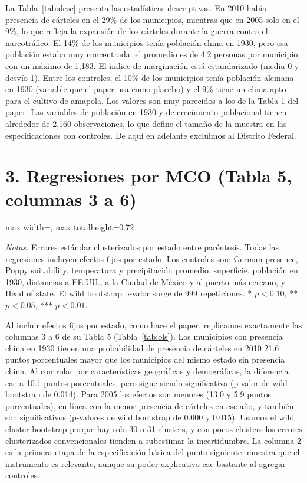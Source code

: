 \documentclass[11pt,a4paper]{article}
\newcommand{\tabla}[1]{\begin{adjustbox}{max width=\linewidth, max totalheight=0.72\textheight}\end{adjustbox}}
\newcommand{\notas}[1]{\par\vspace{0.3em}\begin{minipage}{0.92\linewidth}\footnotesize\textit{Notas:} #1\end{minipage}}
\begin{document}
La Tabla~\ref{tab:desc} presenta las estadísticas descriptivas. En 2010 había presencia de cárteles en el 29\% de los municipios, mientras que en 2005 solo en el 9\%, lo que refleja la expansión de los cárteles durante la guerra contra el narcotráfico. El 14\% de los municipios tenía población china en 1930, pero esa población estaba muy concentrada: el promedio es de 4.2 personas por municipio, con un máximo de 1,183. El índice de marginación está estandarizado (media 0 y desvío 1). Entre los controles, el 10\% de los municipios tenía población alemana en 1930 (variable que el paper usa como placebo) y el 9\% tiene un clima apto para el cultivo de amapola. Los valores son muy parecidos a los de la Tabla 1 del paper. Las variables de población en 1930 y de crecimiento poblacional tienen alrededor de 2,160 observaciones, lo que define el tamaño de la muestra en las especificaciones con controles. De aquí en adelante excluimos al Distrito Federal.

\section*{3. Regresiones por MCO (Tabla 5, columnas 3 a 6)}

\begin{table}[H]\centering
\caption{Presencia china y presencia de cárteles (MCO)}\label{tab:ols}
\small
\tabla{"../output/Tabla 2.tex"}
\notas{Errores estándar clusterizados por estado entre paréntesis. Todas las regresiones incluyen efectos fijos por estado. Los controles son: German presence, Poppy suitability, temperatura y precipitación promedio, superficie, población en 1930, distancias a EE.UU., a la Ciudad de México y al puerto más cercano, y Head of state. El wild bootstrap p-valor surge de 999 repeticiones. * $p<0.10$, ** $p<0.05$, *** $p<0.01$.}
\end{table}

Al incluir efectos fijos por estado, como hace el paper, replicamos exactamente las columnas 3 a 6 de su Tabla 5 (Tabla~\ref{tab:ols}). Los municipios con presencia china en 1930 tienen una probabilidad de presencia de cárteles en 2010 21.6 puntos porcentuales mayor que los municipios del mismo estado sin presencia china. Al controlar por características geográficas y demográficas, la diferencia cae a 10.1 puntos porcentuales, pero sigue siendo significativa (p-valor de wild bootstrap de 0.014). Para 2005 los efectos son menores (13.0 y 5.9 puntos porcentuales), en línea con la menor presencia de cárteles en ese año, y también son significativos (p-valores de wild bootstrap de 0.000 y 0.015). Usamos el wild cluster bootstrap porque hay solo 30 o 31 clusters, y con pocos clusters los errores clusterizados convencionales tienden a subestimar la incertidumbre. La columna 2 es la primera etapa de la especificación básica del punto siguiente: muestra que el instrumento es relevante, aunque su poder explicativo cae bastante al agregar controles.
\end{document}
